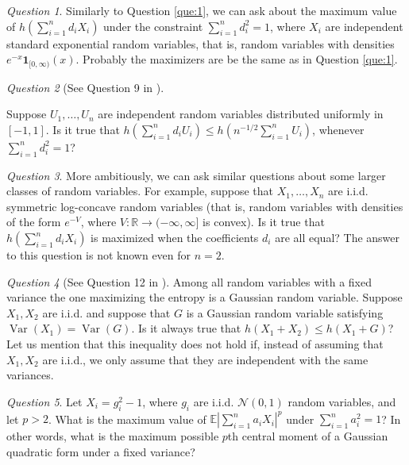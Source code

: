 \documentclass[11pt]{amsart}
\newcommand{\mc}[1]{\mathcal{{#1}}}
\newcommand{\1}{\mathbf{1}}
\newcommand{\R}{\mathbb{R}}
\newcommand{\E}{\mathbb{E}}
\DeclareMathOperator{\var}{Var}
\theoremstyle{definition}
\theoremstyle{definition}
\theoremstyle{remark}
\newtheorem{question}{Question}
\begin{document}
\begin{question}
Similarly to Question \ref{que:1}, we can ask about the maximum value of $h(\sum_{i=1}^n d_i X_i)$ under the constraint $\sum_{i=1}^n d_i^2 =1$, where $X_i$ are independent standard exponential random variables, that is, random variables with densities $e^{-x}\1_{[0,\infty)}(x)$. Probably the maximizers are be the same as in Question \ref{que:1}.
\end{question} 
 
\begin{question}[See Question 9 in \cite{ENT18}]\label{que:uniform}

Suppose $U_1, \ldots, U_n$ are independent random variables distributed uniformly in $[-1,1]$. Is it true that $h(\sum_{i=1}^n d_i U_i) \leq h(n^{-1/2} \sum_{i=1}^n U_i)$, whenever $\sum_{i=1}^n d_i^2=1$? 
\end{question} 

\begin{question}
More ambitiously, we can ask similar questions about some larger classes of random variables. For example, suppose that $X_1, \ldots, X_n$ are i.i.d. symmetric log-concave random variables (that is, random variables with densities of the form $e^{-V}$, where $V:\R \to (-\infty,\infty]$ is convex). Is it true that $h(\sum_{i=1}^n d_i X_i)$ is maximized when the coefficients $d_i$ are all equal? The answer to this question is not known even for $n=2$. 
\end{question}

\begin{question}[See Question 12 in \cite{ENT18}]
Among all random variables with a fixed variance the one maximizing the entropy is a Gaussian random variable. Suppose $X_1, X_2$ are i.i.d. and suppose that $G$ is a Gaussian random variable satisfying $\var(X_1)=\var(G)$. Is it always true that $h(X_1+X_2) \leq h(X_1+G)$? Let us mention that this inequality does not hold if, instead of assuming that $X_1, X_2$ are i.i.d., we only assume that they are independent with the same variances.
\end{question}

\begin{question}\label{que:pth-for-gauss}
Let $X_i=g_i^2-1$, where $g_i$ are i.i.d. $\mc{N}(0,1)$ random variables, and let $p>2$. What is the maximum value of $\E\left| \sum_{i=1}^n a_i X_i \right|^p$ under $\sum_{i=1}^n a_i^2 =1$? In other words, what is the maximum possible $p$th central moment of a Gaussian quadratic form under a fixed variance? 
\end{question}
\end{document}
